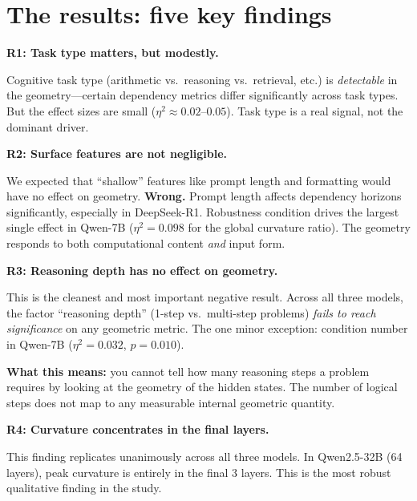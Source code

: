 \documentclass[11pt, twoside, openright]{memoir}
\begin{document}
\section{The results: five key findings}

\begin{finding}
\textbf{R1: Task type matters, but modestly.}

Cognitive task type (arithmetic vs.\ reasoning vs.\ retrieval, etc.) is
\emph{detectable} in the geometry---certain dependency metrics differ
significantly across task types. But the effect sizes are small
($\eta^2 \approx 0.02$--$0.05$). Task type is a real signal, not the
dominant driver.
\end{finding}

\begin{finding}
\textbf{R2: Surface features are not negligible.}

We expected that ``shallow'' features like prompt length and formatting would
have no effect on geometry. \textbf{Wrong.} Prompt length affects dependency
horizons significantly, especially in DeepSeek-R1. Robustness condition
drives the largest single effect in Qwen-7B ($\eta^2 = 0.098$ for the
global curvature ratio). The geometry responds to both computational content
\emph{and} input form.
\end{finding}

\begin{finding}
\textbf{R3: Reasoning depth has no effect on geometry.}

This is the cleanest and most important negative result. Across all three
models, the factor ``reasoning depth'' (1-step vs.\ multi-step problems)
\emph{fails to reach significance} on any geometric metric. The one minor
exception: condition number in Qwen-7B ($\eta^2 = 0.032$, $p = 0.010$).

\textbf{What this means:} you cannot tell how many reasoning steps a problem
requires by looking at the geometry of the hidden states. The number of
logical steps does not map to any measurable internal geometric quantity.
\end{finding}

\begin{finding}
\textbf{R4: Curvature concentrates in the final layers.}

This finding replicates unanimously across all three models. In Qwen2.5-32B
(64 layers), peak curvature is entirely in the final 3 layers. This is the
most robust qualitative finding in the study.
\end{finding}
\end{document}

